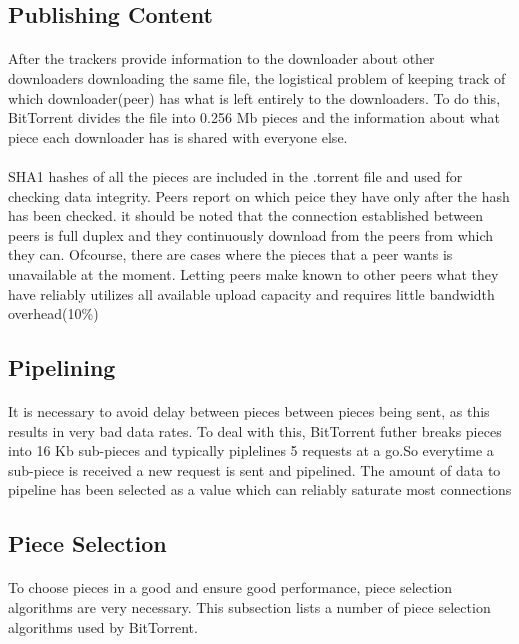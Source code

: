 \documentclass[24 pts]{article}
\begin{document}
\subsection{Publishing Content}\paragraph{}
After the trackers provide information to the downloader about other downloaders downloading the same file, the logistical problem of keeping track of which downloader(peer) has what is left entirely to the downloaders. To do this, BitTorrent divides the file into 0.256 Mb pieces and the information about what piece each downloader has is shared with everyone else. \paragraph{}SHA1 hashes of all the pieces are included in the  .torrent file and used for checking data integrity. Peers report on which peice they have only after the hash has been checked. it should be noted that the connection established between peers is full duplex and they continuously download from the peers from which they can. Ofcourse, there are cases where the pieces that a peer wants is unavailable at the moment. Letting peers make known to other peers what they have reliably utilizes all available upload capacity and requires little bandwidth overhead(10\%)

\subsection{Pipelining}\paragraph{}
It is necessary to avoid delay between pieces between pieces being sent, as this results in very bad data rates. To deal with this, BitTorrent futher breaks pieces into 16 Kb sub-pieces and typically piplelines 5 requests at a go.So everytime a sub-piece is received a new request is sent and pipelined. The amount of data to pipeline has been selected as a value which can reliably saturate most connections

\subsection{Piece Selection}\paragraph{}
To choose pieces in a good and ensure good performance, piece selection algorithms are very necessary. This subsection lists a number of piece selection algorithms used by BitTorrent.
\end{document}

